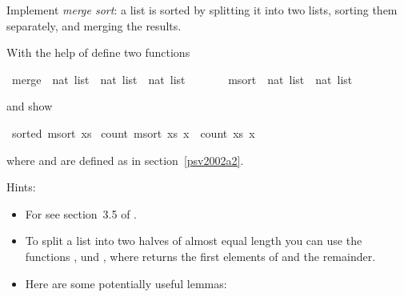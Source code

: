 %
\begin{isabellebody}%
\def\isabellecontext{a{\isadigit{5}}}%
\isamarkupfalse%
%
\isamarkuptrue%
%
\begin{isamarkuptext}%
Implement \emph{merge sort}: a list is sorted by splitting it
into two lists, sorting them separately, and merging the results.

With the help of  define two functions%
\end{isamarkuptext}%
\isamarkuptrue%
\ merge\ {\isacharcolon}{\isacharcolon}\ {\isachardoublequote}nat\ list\ {\isasymtimes}\ nat\ list\ {\isasymRightarrow}\ nat\ list{\isachardoublequote}\isanewline
\ \ \ \ \ \ \ msort\ {\isacharcolon}{\isacharcolon}\ {\isachardoublequote}nat\ list\ {\isasymRightarrow}\ nat\ list{\isachardoublequote}\isamarkupfalse%
%
\begin{isamarkuptext}%
and show%
\end{isamarkuptext}%
\isamarkuptrue%
\ {\isachardoublequote}sorted\ {\isacharparenleft}msort\ xs{\isacharparenright}{\isachardoublequote}\isamarkupfalse%
\isanewline
\isamarkupfalse%
\ {\isachardoublequote}count\ {\isacharparenleft}msort\ xs{\isacharparenright}\ x\ {\isacharequal}\ count\ xs\ x{\isachardoublequote}\isamarkupfalse%
\isamarkupfalse%
%
\begin{isamarkuptext}%
where  and  are defined as in
section~\ref{psv2002a2}.

Hints:
\begin{itemize}
\item For  see section~3.5 of \cite{isabelle-tutorial}.

\item To split a list into two halves of almost equal length you can
use the functions \mbox{},  und ,
where  returns the first  elements of
 and  the remainder.

\item Here are some potentially useful lemmas:\\
   \\
   \\
   
\end{itemize}%
\end{isamarkuptext}%
\isamarkuptrue%
\isamarkupfalse%
\end{isabellebody}%
